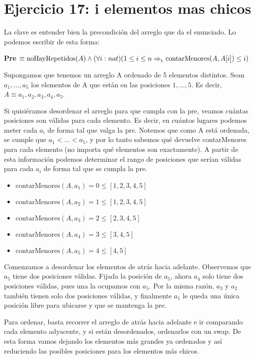 \section{Ejercicio 17: i elementos mas chicos}

La clave es entender bien la precondición del arreglo que da el enunciado. Lo podemos escribir de esta forma:

\textbf{Pre} $\equiv \text{noHayRepetidos}(A) \land (\forall i: nat)(1 \leq i \leq n \Rightarrow_{\mathrm{\scriptscriptstyle{L}}} \text{contarMenores}(A, A[i]) \leq i)$

Supongamos que tenemos un arreglo A ordenado de 5 elementos distintos. Sean $a_1, \dots, a_5$ los elementos de A que están en las posiciones $1, \dots, 5$. Es decir, $A \equiv a_1, a_2, a_3, a_4, a_5$.

Si quisiéramos desordenar el arreglo para que cumpla con la pre, veamos cuántas posiciones son válidas para cada elemento. Es decir, en cuántos lugares podemos meter cada $a_i$ de forma tal que valga la pre. Notemos que como A está ordenada, se cumple que $a_1 < \dots < a_5$, y por lo tanto sabemos qué devuelve contarMenores para cada elemento (no importa qué elementos son exactamente). A partir de esta información podemos determinar el rango de posiciones que serían válidas para cada $a_i$ de forma tal que se cumpla la pre.

\begin{itemize}
    \item $\text{contarMenores}(A, a_1) = 0 \leq [1, 2, 3, 4, 5]$
    \item $\text{contarMenores}(A, a_2) = 1 \leq [1, 2, 3, 4, 5]$
    \item $\text{contarMenores}(A, a_3) = 2 \leq [2, 3, 4, 5]$
    \item $\text{contarMenores}(A, a_4) = 3 \leq [3, 4, 5]$
    \item $\text{contarMenores}(A, a_5) = 4 \leq [4, 5]$
\end{itemize}

Comenzamos a desordenar los elementos de atrás hacia adelante. Observemos que $a_5$ tiene dos posiciones válidas. Fijada la posición de $a_5$, ahora $a_4$ solo tiene dos posiciones válidas, pues una la ocupamos con $a_5$. Por la misma razón, $a_3$ y $a_2$ también tienen solo dos posiciones válidas, y finalmente $a_1$ le queda una única posición libre para ubicarse y que se mantenga la pre.

Para ordenar, basta recorrer el arreglo de atrás hacia adelante e ir comparando cada elemento adyacente, y si están desordenados, ordenarlos con un swap. De esta forma vamos dejando los elementos más grandes ya ordenados y así reduciendo las posibles posiciones para los elementos más chicos.

